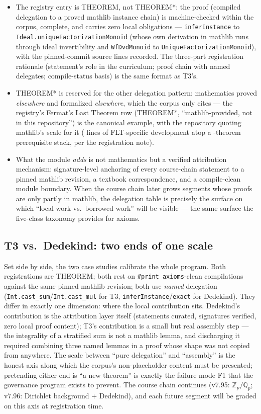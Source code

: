 \begin{itemize}
\item The registry entry is THEOREM, not THEOREM*: the proof
(compiled delegation to a proved mathlib instance chain) is
machine-checked within the corpus, complete, and carries zero
local obligations --- \texttt{inferInstance} to
\texttt{Ideal.\allowbreak uniqueFactorizationMonoid} (whose own derivation in
mathlib runs through ideal invertibility and
\texttt{WfDvdMonoid} to \texttt{UniqueFactorizationMonoid}),
with the pinned-commit source lines recorded. The three-part
registration rationale (statement's role in the curriculum; proof
chain with named delegates; compile-status basis) is the same
format as T3's.
\item THEOREM* is reserved for the other delegation pattern:
mathematics proved \emph{elsewhere} and formalized
\emph{elsewhere}, which the corpus only cites --- the registry's
Fermat's Last Theorem row (THEOREM*, ``mathlib-provided, not in
this repository'') is the canonical example, with the repository
quoting mathlib's scale for it ( lines of FLT-specific
development atop a -theorem prerequisite stack,
per the registration note).
\item What the module \emph{adds} is not mathematics but a
verified attribution mechanism: signature-level anchoring of every
course-chain statement to a pinned mathlib revision, a textbook
correspondence, and a compile-clean module boundary. When the
course chain later grows segments whose proofs are only partly in
mathlib, the delegation table is precisely the surface on which
``local work vs.\ borrowed work'' will be visible --- the same
surface the five-class taxonomy provides for axioms.
\end{itemize}

\subsection{T3 vs.\ Dedekind: two ends of one scale}
\label{sec:dedekind-contrast}
Set side by side, the two case studies calibrate the whole
program. Both registrations are THEOREM; both rest on
\texttt{\#print axioms}-clean compilations against the same pinned
mathlib revision; both use \emph{named} delegation
(\texttt{Int.cast\_sum}/\texttt{Int.cast\_mul} for T3,
\texttt{inferInstance}/\texttt{exact} for Dedekind). They differ
in exactly one dimension: where the local contribution sits.
Dedekind's contribution is the attribution layer itself (statements
curated, signatures verified, zero local proof content); T3's
contribution is a small but real assembly step --- the integrality
of a stratified sum is not a mathlib lemma, and discharging it
required combining three named lemmas in a proof whose shape was
not copied from anywhere. The scale between ``pure delegation''
and ``assembly'' is the honest axis along which the corpus's
non-placeholder content must be presented; pretending either end
is ``a new theorem'' is exactly the failure mode F1 that the
governance program exists to prevent. The course chain continues
(v7.95: $\mathbb{Z}_p/\mathbb{Q}_p$; v7.96: Dirichlet background +
Dedekind), and each future segment will be graded on this axis at
registration time.

